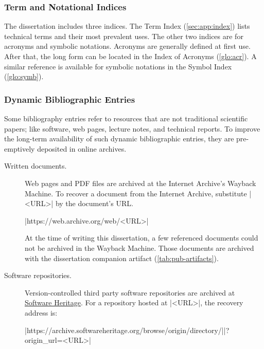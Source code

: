 \subsubsection{Term and Notational Indices}

The dissertation includes three indices.
The Term Index (\autoref{sec:app:index}) lists technical terms and their most prevalent uses.
The other two indices are for acronyms and symbolic notations.
Acronyms are generally defined at first use.
After that, the long form can be located in the Index of Acronyms (\autoref{glo:acr}).
A similar reference is available for symbolic notations in the Symbol Index (\autoref{glo:symb}).

\subsubsection{Dynamic Bibliographic Entries}

Some bibliography entries refer to resources that are not traditional scientific papers;
like software, web pages, lecture notes, and technical reports.
To improve the long-term availability of such dynamic bibliographic entries, they are pre-emptively deposited in online archives.

\begin{description}
\item[Written documents.]
Web pages and PDF files are archived at the Internet Archive's Wayback Machine.
To recover a document from the Internet Archive, substitute \pr|<URL>| by the document's URL.
\begin{center}\pr|https://web.archive.org/web/<URL>|\end{center}
At the time of writing this dissertation, a few referenced documents could not be archived in the Wayback Machine.
Those documents are archived with the dissertation companion artifact (\autoref{tab:pub-artifacts}).

\item[Software repositories.]
Version-controlled third party software repositories are archived at
\href{https://softwareheritage.org}{Software Heritage}.
For a repository hosted at \pr|<URL>|, the recovery address is:%
\begin{center}\pr|https://archive.softwareheritage.org/browse/origin/directory/|\mbox{\pr|?origin_url=<URL>|}\end{center}
\end{description}

